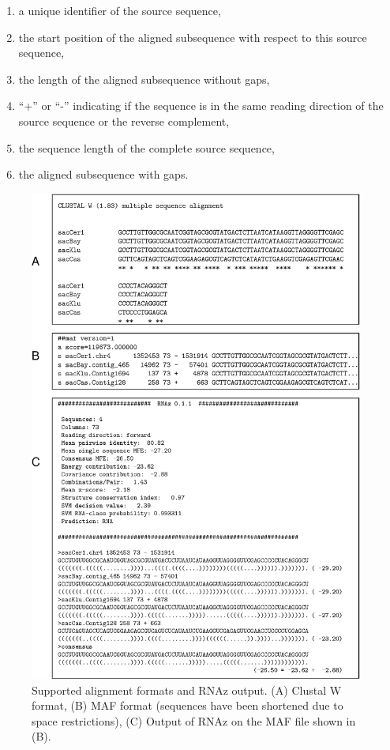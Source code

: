 \documentclass[11pt]{article}
\begin{document}
\begin{enumerate}

\item a unique identifier of the source sequence,
\item the start position of the aligned subsequence with respect to this
  source sequence,
\item the length of the aligned subsequence without gaps,
\item ``+'' or ``-'' indicating if the sequence is in the same reading
  direction of the source sequence or the reverse complement,
\item the sequence length of the complete source sequence,
\item the aligned subsequence with gaps.

\end{enumerate}


\begin{figure}
\centerline{\includegraphics*[width=11cm]{figs/formats.eps}}
\caption{Supported alignment formats and RNAz output. (A) Clustal W format,
  (B) MAF format (sequences have been shortened due to space restrictions),
  (C) Output of RNAz on the MAF file shown in (B).}
\label{fig:formats}
\end{figure}
\end{document}
